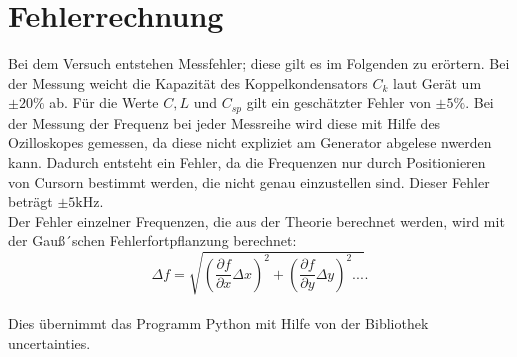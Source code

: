 \section{Fehlerrechnung}
 \label{fehlerrechnung}
Bei dem Versuch entstehen Messfehler;
diese gilt es im Folgenden zu erörtern.
Bei der Messung weicht die Kapazität des Koppelkondensators $C_k$ laut Gerät um $\pm 20 \%$ ab. Für die Werte $C,L $ und $C_{sp}$ gilt
ein geschätzter Fehler von $ \pm 5 \% $. %
Bei der Messung der Frequenz bei jeder Messreihe
wird diese mit Hilfe des Ozilloskopes gemessen,
da diese nicht expliziet am Generator abgelese nwerden kann.
Dadurch entsteht ein Fehler, da die Frequenzen
nur durch Positionieren von Cursorn bestimmt werden,
die nicht genau einzustellen sind. Dieser Fehler beträgt $\pm 5 \si{\kilo\hertz}$.
\\
Der Fehler einzelner Frequenzen, die aus der Theorie berechnet werden, wird mit der Gauß´schen Fehlerfortpflanzung
berechnet:
\begin{equation}
\Delta f= \sqrt{\left(\frac{\partial f}{\partial x}\Delta x \right)^{2} + \left( \frac{\partial f}{\partial y}\Delta y\right)^2...}\label{eqn:gaus}.
\end{equation}
\\
Dies übernimmt das Programm Python mit Hilfe von der Bibliothek uncertainties.
